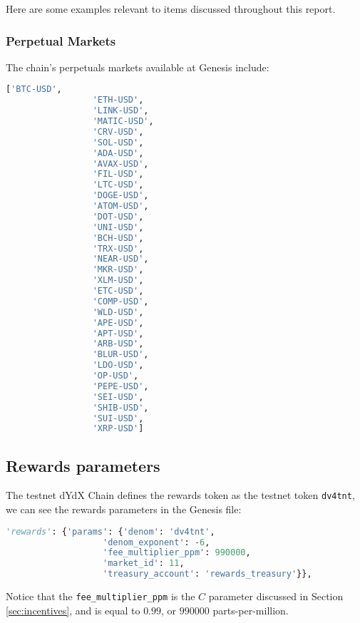         Here are some examples relevant to items discussed throughout this report.

        \subsubsection{Perpetual Markets} \label{appsubsec:perps}

            The chain's perpetuals markets available at Genesis include:

            \begin{lstlisting}[language=bash]
                ['BTC-USD',
                 'ETH-USD',
                 'LINK-USD',
                 'MATIC-USD',
                 'CRV-USD',
                 'SOL-USD',
                 'ADA-USD',
                 'AVAX-USD',
                 'FIL-USD',
                 'LTC-USD',
                 'DOGE-USD',
                 'ATOM-USD',
                 'DOT-USD',
                 'UNI-USD',
                 'BCH-USD',
                 'TRX-USD',
                 'NEAR-USD',
                 'MKR-USD',
                 'XLM-USD',
                 'ETC-USD',
                 'COMP-USD',
                 'WLD-USD',
                 'APE-USD',
                 'APT-USD',
                 'ARB-USD',
                 'BLUR-USD',
                 'LDO-USD',
                 'OP-USD',
                 'PEPE-USD',
                 'SEI-USD',
                 'SHIB-USD',
                 'SUI-USD',
                 'XRP-USD']
            \end{lstlisting}

        \subsection{Rewards parameters}

            The testnet dYdX Chain defines the rewards token as the testnet token \texttt{dv4tnt}, we can see the rewards parameters in the Genesis file:

            \begin{lstlisting}[language=python]
                 'rewards': {'params': {'denom': 'dv4tnt',
                   'denom_exponent': -6,
                   'fee_multiplier_ppm': 990000,
                   'market_id': 11,
                   'treasury_account': 'rewards_treasury'}},
            \end{lstlisting}

            Notice that the \texttt{fee\_multiplier\_ppm} is the $C$ parameter discussed in Section \ref{sec:incentives}, and is equal to $0.99$, or $990000$ parts-per-million.